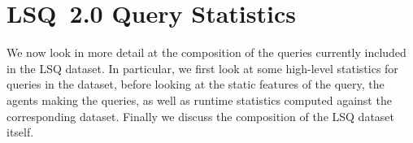 





\section{LSQ~2.0 Query Statistics}\label{sec:queries}

We now look in more detail at the composition of the queries currently included in the LSQ dataset. In particular, we first look at some high-level statistics for queries in the dataset, before looking at the static features of the query, the agents making the queries, as well as runtime statistics computed against the corresponding dataset. Finally we discuss the composition of the LSQ dataset itself.





